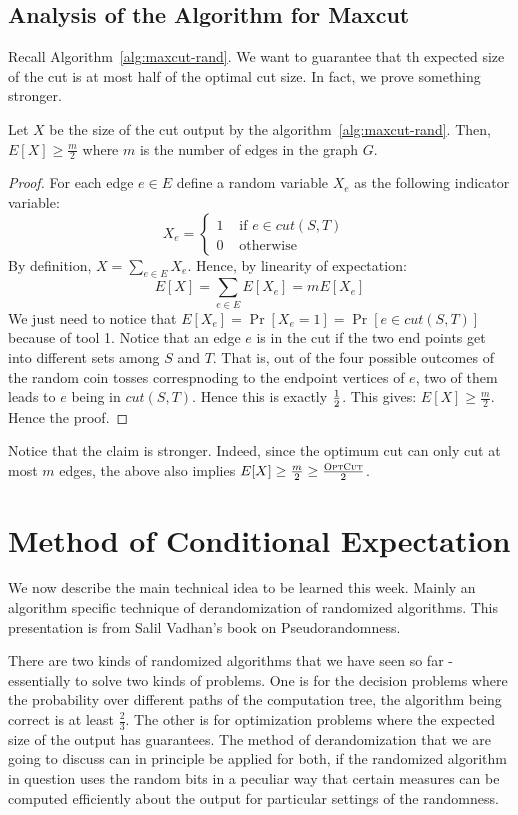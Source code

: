 \subsection{Analysis of the Algorithm for {\sc Maxcut}}
Recall Algorithm~\ref{alg:maxcut-rand}. We want to guarantee that th expected size of the cut is at most half of the optimal cut size. In fact, we prove something stronger.
\begin{claim}
Let $X$ be the size of the cut output by the algorithm~\ref{alg:maxcut-rand}. Then, $E[X] \ge \frac{m}{2}$ where $m$ is the number of edges in the graph $G$.
\end{claim}
\begin{proof}
For each edge $e \in E$ define a random variable $X_e$ as the following indicator variable:
$$ X_e = \begin{cases} 1 & \textrm{ if $e \in cut(S,T)$ } \\
0 & \textrm{ otherwise } \end{cases} $$
By definition, $X = \sum_{e \in E} X_e$. Hence, by linearity of expectation:
$$E[X] = \sum_{e \in E} E[X_e] = m E[X_e]$$
We just need to notice that $E[X_e] = \Pr[X_e = 1] = \Pr[e \in cut(S,T)]$ because of tool 1. Notice that an edge $e$ is in the cut if the two end points get into different sets among $S$ and $T$. That is, out of the four possible outcomes of the random coin tosses correspnoding to the endpoint vertices of $e$, two of them leads to $e$ being in $cut(S,T)$. Hence this is exactly $\frac{1}{2}$. This gives:
$E[X] \ge \frac{m}{2}$. Hence the proof.
\end{proof}
Notice that the claim is stronger. Indeed, since the optimum cut can only cut at most $m$ edges, the above also implies $E[X] \ge \frac{m}{2} \ge \frac{\textrm{\sc OptCut}}{2}$.

\section{Method of Conditional Expectation}

We now describe the main technical idea to be learned this week. Mainly an algorithm specific technique of derandomization of randomized algorithms. This presentation is from Salil Vadhan's book on Pseudorandomness.

There are two kinds of randomized algorithms that we have seen so far - essentially to solve two kinds of problems. One is for the decision problems where the probability over different paths of the  computation tree, the algorithm being correct is at least $\frac{2}{3}$. The other is for optimization problems where the expected size of the output has guarantees. The method of derandomization that we are going to discuss can in principle be applied for both, if the randomized algorithm in question uses the random bits in a peculiar way that certain measures can be computed efficiently about the output for particular settings of the randomness. \\[-8mm]

